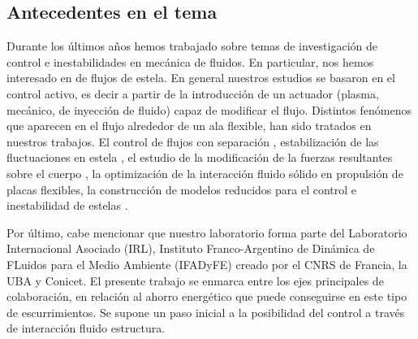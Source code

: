 \documentclass[spanish]{article}
\begin{document}
	\subsection*{Antecedentes en el tema}
Durante los últimos años hemos trabajado sobre temas de investigación de 
control e inestabilidades en mecánica de fluidos. En particular, nos hemos interesado en  
de flujos de estela. En 
general nuestros estudios se basaron en el control activo, es decir a partir de 
la introducción de un actuador (plasma, mecánico, de inyección de fluido) capaz 
de modificar el flujo.  Distintos fenómenos que aparecen en el flujo 
alrededor de un ala flexible, han sido tratados en nuestros trabajos. El 
control de flujos con separación \cite{dadamo2014a}, 
estabilización de las fluctuaciones en estela 
\cite{dadamo2017a,castro2020vortex}, el estudio de la modificación de la 
fuerzas resultantes sobre el cuerpo \cite{sosa2009a,dadamo2011b,sosa2013}, la optimización de la interacción fluido sólido en propulsión de placas flexibles\cite{dadamo2022wake}, la 
construcción de modelos reducidos para el control e inestabilidad de estelas
\cite{boury2018forced}.

Por último, cabe mencionar que nuestro laboratorio forma parte del Laboratorio 
Internacional Asociado (IRL),  Instituto Franco-Argentino de Dinámica de FLuidos para el Medio Ambiente (IFADyFE) creado por el CNRS de Francia, la UBA y Conicet. El presente trabajo se enmarca entre los ejes principales de colaboración, en relación al ahorro energético que puede conseguirse en este tipo de escurrimientos. Se supone un paso inicial a la posibilidad del control a través de interacción fluido estructura. 
\end{document}
